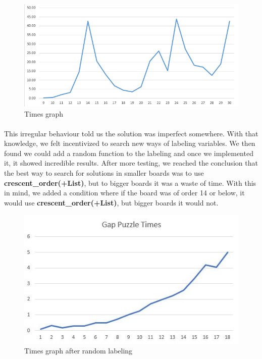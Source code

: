 \documentclass[runningheads]{llncs}
\begin{document}
\begin{figure}
    \begin{center}
        \includegraphics[scale=0.5]{images/graph.png}
        \caption{Times graph} \label{fig5}
    \end{center}
\end{figure}

\paragraph{}
This irregular behaviour told us the solution was imperfect somewhere. With that knowledge, we felt incentivized to search new ways of labeling variables.
We then found we could add a random function to the labeling and once we implemented it, it showed incredible results. After more testing, we reached the conclusion
that the best way to search for solutions in smaller boards was to use \textbf{crescent\_order(+List)}, but to bigger boards it was a waste of time. With this in mind,
we added a condition where if the board was of order 14 or below, it would use \textbf{crescent\_order(+List)}, but bigger boards it would not.

\begin{figure}
    \begin{center}
        \includegraphics[scale=0.5]{images/graph2.png}
        \caption{Times graph after random labeling} \label{fig5}
    \end{center}
\end{figure}
\end{document}

